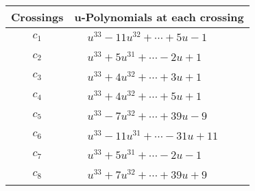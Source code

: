 \documentclass[1p]{elsarticle_modified}
\theoremstyle{definition}
\begin{document}
\begin{tabular}{m{50pt}|m{274pt}}
Crossings & \hspace{64pt}u-Polynomials at each crossing \\
\hline $$\begin{aligned}c_{1}\end{aligned}$$&$\begin{aligned}
&u^{33}-11 u^{32}+\cdots+5 u-1
\end{aligned}$\\
\hline $$\begin{aligned}c_{2}\end{aligned}$$&$\begin{aligned}
&u^{33}+5 u^{31}+\cdots-2 u+1
\end{aligned}$\\
\hline $$\begin{aligned}c_{3}\end{aligned}$$&$\begin{aligned}
&u^{33}+4 u^{32}+\cdots+3 u+1
\end{aligned}$\\
\hline $$\begin{aligned}c_{4}\end{aligned}$$&$\begin{aligned}
&u^{33}+4 u^{32}+\cdots+5 u+1
\end{aligned}$\\
\hline $$\begin{aligned}c_{5}\end{aligned}$$&$\begin{aligned}
&u^{33}-7 u^{32}+\cdots+39 u-9
\end{aligned}$\\
\hline $$\begin{aligned}c_{6}\end{aligned}$$&$\begin{aligned}
&u^{33}-11 u^{31}+\cdots-31 u+11
\end{aligned}$\\
\hline $$\begin{aligned}c_{7}\end{aligned}$$&$\begin{aligned}
&u^{33}+5 u^{31}+\cdots-2 u-1
\end{aligned}$\\
\hline $$\begin{aligned}c_{8}\end{aligned}$$&$\begin{aligned}
&u^{33}+7 u^{32}+\cdots+39 u+9
\end{aligned}$\\

\end{tabular}
\end{document}
